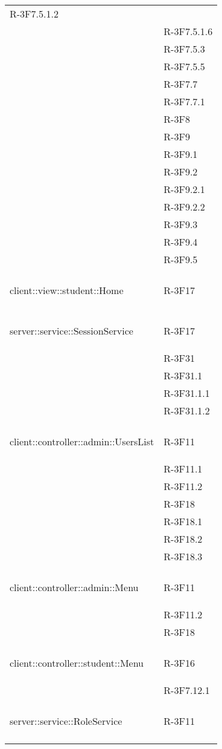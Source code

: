 \begin{longtable}{l p{3cm}}
R-3F7.5.1.2 \tabularnewline &

R-3F7.5.1.6 \tabularnewline &

R-3F7.5.3 \tabularnewline &

R-3F7.5.5 \tabularnewline &

R-3F7.7 \tabularnewline &

R-3F7.7.1 \tabularnewline &

R-3F8 \tabularnewline &

R-3F9 \tabularnewline &

R-3F9.1 \tabularnewline &

R-3F9.2 \tabularnewline &

R-3F9.2.1 \tabularnewline &

R-3F9.2.2 \tabularnewline &

R-3F9.3 \tabularnewline &

R-3F9.4 \tabularnewline &

R-3F9.5 \tabularnewline &\tabularnewline
\midrule
\hypertarget{client::view::student::Home}{client::view::student::Home} & R-3F17 \tabularnewline &\tabularnewline
\midrule
\hypertarget{server::service::SessionService}{server::service::SessionService} & R-3F17 \tabularnewline &

R-3F31 \tabularnewline &

R-3F31.1 \tabularnewline &

R-3F31.1.1 \tabularnewline &

R-3F31.1.2 \tabularnewline &\tabularnewline
\midrule
\hypertarget{client::controller::admin::UsersList}{client::controller::admin::UsersList} & R-3F11 \tabularnewline &

R-3F11.1 \tabularnewline &

R-3F11.2 \tabularnewline &

R-3F18 \tabularnewline &

R-3F18.1 \tabularnewline &

R-3F18.2 \tabularnewline &

R-3F18.3 \tabularnewline &\tabularnewline
\midrule
\hypertarget{client::controller::admin::Menu}{client::controller::admin::Menu} & R-3F11 \tabularnewline &

R-3F11.2 \tabularnewline &

R-3F18 \tabularnewline &\tabularnewline
\midrule
\hypertarget{client::controller::student::Menu}{client::controller::student::Menu} & R-3F16 \tabularnewline &

R-3F7.12.1 \tabularnewline &\tabularnewline
\midrule
\hypertarget{server::service::RoleService}{server::service::RoleService} & R-3F11 \tabularnewline &


\end{longtable}
